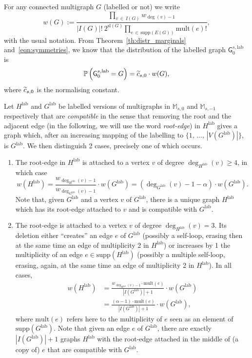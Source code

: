 \documentclass[AHL,Unicode,longabstracts,published]{cedram}
\newcommand{\supp}{\mathrm{supp}}
\newcommand{\sll}{\mathrm{sl}}
\newcommand{\lab}{\mathrm{lab}}
\newcommand{\mult}{\mathrm{mult}}
\newcommand{\sG}{\mathsf{G}}
\newcommand{\M}{\mathbb{M}}
\newcommand{\bbP}{\mathbb{P}}
\newcommand*{\alphenumi}{\renewcommand*{\theenumi}{\alph{enumi}}}
\let\oldtilde\tilde
\renewcommand*{\tilde}[1]{\mathchoice{\widetilde{#1}}{\widetilde{#1}}{\oldtilde{#1}}{\oldtilde{#1}}}
\begin{document}
For any connected multigraph $G$ (labelled or not) we write
\[
w(G):=\frac{\prod\limits_{v\,\in\,I(G)} w_{\deg(v)-1}}{|I(G)|!~2^{\sll(G)}\prod\limits_{e\,\in\,\supp(E(G))}\mult(e)!},
\]
with the usual notation. From Theorem~\ref{th:distr_marginals} and~\eqref{eqn:symmetries}, we know that the distribution of the labelled graph $\sG_{0}^{s,\lab}$ is
\begin{equation}\label{eq:distretiq_0}
\bbP\left(\sG_{0}^{s,\lab}=G\right)=\tilde{c}_{s,0} \cdot w(G),
\end{equation}
where $\tilde{c}_{s,0}$ is the normalising constant.

Let $H^{\lab}$ and $G^{\lab}$ be labelled versions of multigraphs in $\M_{s,0}$ and $\M_{s,-1}$ respectively that are \emph{compatible} in the sense that removing the root and the adjacent edge (in the following, we will use the word \emph{root-edge}) in $H^{\lab}$ gives a graph which, after an increasing mapping of the labelling to $\{1,\,\ldots,\,|V(G^{\lab})|\}$, is $G^{\lab}$. We then distinguish 2 cases, precisely one of which occurs.
\begin{enumerate}\alphenumi
\item\label{sect3.5.case:a} The root-edge in $H^{\lab}$ is attached to a vertex $v$ of degree $\deg_{H^{\lab}}(v) \geq 4$, in which case
\[
w\left(H^{\lab}\right)=\frac{w_{\deg_{H^{\lab}}(v)-1}}{w_{\deg_{G^{\lab}}(v)-1}}\cdot w\left(G^{\lab}\right)=\left(\deg_{G^{\lab}}(v)-1-\alpha\right) \cdot w\left(G^{\lab}\right).
\]
Note that, given $G^{\lab}$ and a vertex $v$ of $G^{\lab}$, there is a unique graph $H^{\lab}$ which has its root-edge attached to $v$ and is compatible with $G^{\lab}$.
\item\label{sect3.5.case:b} The root-edge is attached to a vertex $v$ of degree $\deg_{H^{\lab}}(v) = 3$. Its deletion either ``creates'' an edge $e$ of $G^{\lab}$ (possibly a self-loop, erasing then at the same time an edge of multiplicity 2 in $H^{\lab}$) or increases by 1 the multiplicity of an edge $e \in \supp(H^{\lab})$ (possibly a multiple self-loop, erasing, again, at the same time an edge of multiplicity 2 in $H^{\lab}$). In all cases,
\begin{align*}
w\left(H^{\lab}\right)&=\frac{w_{\deg_{H^{\lab}}(v)-1} \cdot \mult(e)}{\left|I\left(G^{\lab}\right)\right|+1}\cdot w\left(G^{\lab}\right)\\
&=\frac{(\alpha-1)\cdot \mult(e)}{\left|I\left(G^{\lab}\right)\right|+1}\cdot w\left(G^{\lab}\right),
\end{align*}
where $\mult(e)$ refers here to the multiplicity of $e$ seen as an element of $\supp(G^{\lab})$. Note that given an edge $e$ of $G^{\lab}$, there are exactly $|I(G^{\lab})|+1$ graphs $H^{\lab}$ with the root-edge attached in the middle of (a copy of) $e$ that are compatible with $G^{\lab}$.
\end{enumerate}
\end{document}
